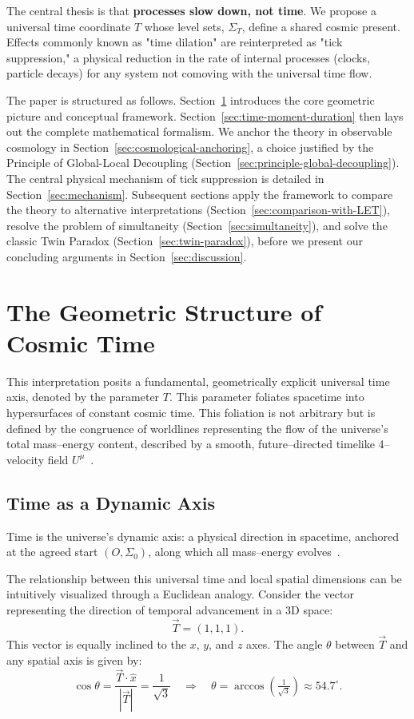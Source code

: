 \documentclass[12pt]{article}
\theoremstyle{plain}
\begin{document}
\medskip
\noindent
The central thesis is that \textbf{processes slow down, not time}. We propose a universal time coordinate $T$ whose level sets, $\Sigma_T$, define a shared cosmic present. Effects commonly known as "time dilation" are reinterpreted as "tick suppression," a physical reduction in the rate of internal processes (clocks, particle decays) for any system not comoving with the universal time flow.

\medskip
\noindent
The paper is structured as follows. Section~\ref{sec:geometric-structure} introduces the core geometric picture and conceptual framework. Section~\ref{sec:time-moment-duration} then lays out the complete mathematical formalism. We anchor the theory in observable cosmology in Section~\ref{sec:cosmological-anchoring}, a choice justified by the Principle of Global-Local Decoupling (Section~\ref{sec:principle-global-decoupling}). The central physical mechanism of tick suppression is detailed in Section~\ref{sec:mechanism}. Subsequent sections apply the framework to compare the theory to alternative interpretations (Section~\ref{sec:comparison-with-LET}), resolve the problem of simultaneity (Section~\ref{sec:simultaneity}), and solve the classic Twin Paradox (Section~\ref{sec:twin-paradox}), before we present our concluding arguments in Section~\ref{sec:discussion}.

\section{The Geometric Structure of Cosmic Time}
\label{sec:geometric-structure}
This interpretation posits a fundamental, geometrically explicit universal time axis, denoted by the parameter $T$. This parameter foliates spacetime into hypersurfaces of constant cosmic time. This foliation is not arbitrary but is defined by the congruence of worldlines representing the flow of the universe's total mass–energy content, described by a smooth, future–directed timelike 4–velocity field $U^\mu$~\cite{Carroll2004}.

\subsection{Time as a Dynamic Axis}
Time is the universe’s dynamic axis: a physical direction in spacetime, anchored at the agreed start $(O,\Sigma_0)$, along which all mass–energy evolves~\cite{Rindler2006}.

\medskip
\noindent The relationship between this universal time and local spatial dimensions can be intuitively visualized through a Euclidean analogy. Consider the vector representing the direction of temporal advancement in a 3D space:
\[
\vec{T} = (1,1,1).
\]
This vector is equally inclined to the $x$, $y$, and $z$ axes. The angle $\theta$ between $\vec{T}$ and any spatial axis is given by:
\[
\cos \theta = \frac{\vec{T} \cdot \hat{x}}{|\vec{T}|} = \frac{1}{\sqrt{3}} \quad \Rightarrow \quad \theta = \arccos\left(\tfrac{1}{\sqrt{3}}\right) \approx 54.7^\circ.
\]
\end{document}
